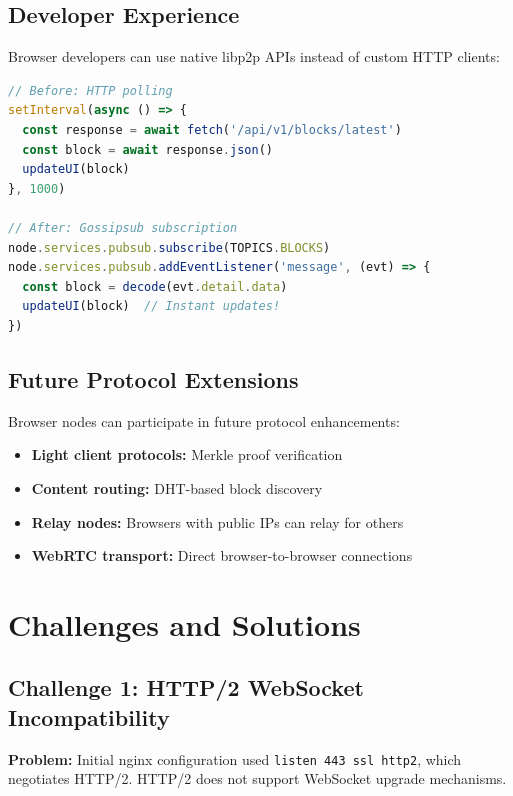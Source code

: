 \documentclass[11pt,a4paper]{article}
\begin{document}
\subsection{Developer Experience}

Browser developers can use native libp2p APIs instead of custom HTTP clients:

\begin{lstlisting}[language=JavaScript]
// Before: HTTP polling
setInterval(async () => {
  const response = await fetch('/api/v1/blocks/latest')
  const block = await response.json()
  updateUI(block)
}, 1000)

// After: Gossipsub subscription
node.services.pubsub.subscribe(TOPICS.BLOCKS)
node.services.pubsub.addEventListener('message', (evt) => {
  const block = decode(evt.detail.data)
  updateUI(block)  // Instant updates!
})
\end{lstlisting}

\subsection{Future Protocol Extensions}

Browser nodes can participate in future protocol enhancements:

\begin{itemize}
    \item \textbf{Light client protocols:} Merkle proof verification
    \item \textbf{Content routing:} DHT-based block discovery
    \item \textbf{Relay nodes:} Browsers with public IPs can relay for others
    \item \textbf{WebRTC transport:} Direct browser-to-browser connections
\end{itemize}

\section{Challenges and Solutions}

\subsection{Challenge 1: HTTP/2 WebSocket Incompatibility}

\textbf{Problem:} Initial nginx configuration used \texttt{listen 443 ssl http2}, which negotiates HTTP/2. HTTP/2 does not support WebSocket upgrade mechanisms.
\end{document}
